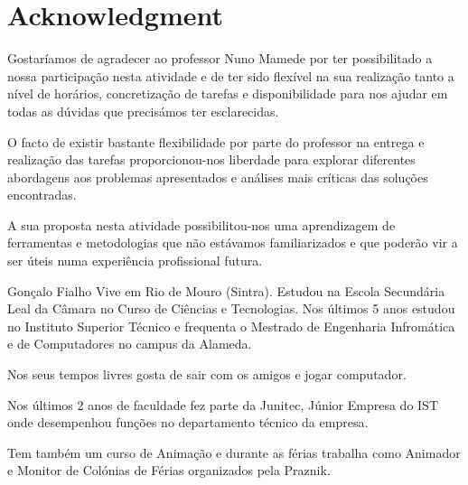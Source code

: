 \documentclass[a4paper,12pt,journal,twoside,compsoc]{PPIEEEtran}
\begin{document}


\ifCLASSOPTIONcompsoc
  \section*{} %
\else
  \section*{Acknowledgment}
\fi

Gostaríamos de agradecer ao professor Nuno Mamede por ter possibilitado a nossa participação nesta atividade e de ter sido flexível na sua realização tanto a nível de horários, concretização de tarefas e disponibilidade para nos ajudar em todas as dúvidas que precisámos ter esclarecidas. 


O facto de existir bastante flexibilidade por parte do professor na entrega e realização das tarefas proporcionou-nos liberdade para explorar diferentes abordagens aos problemas apresentados e análises mais críticas das soluções encontradas.


A sua proposta nesta atividade possibilitou-nos uma aprendizagem de ferramentas e metodologias que não estávamos familiarizados e que poderão vir a ser úteis numa experiência profissional futura.


% 

\begin{IEEEbiography}{Gonçalo Fialho}
Vive em Rio de Mouro (Sintra). Estudou na Escola Secundária Leal da Câmara no Curso de Ciências e Tecnologias. Nos últimos 5 anos estudou no Instituto Superior Técnico e frequenta o Mestrado de Engenharia Infromática e de Computadores no campus da Alameda. 

Nos seus tempos livres gosta de sair com os amigos e jogar computador. 

Nos últimos 2 anos de faculdade fez parte da Junitec, Júnior Empresa do IST onde desempenhou funções no departamento técnico da empresa. 

Tem também um curso de Animação e durante as férias trabalha como Animador e Monitor de Colónias de Férias organizados pela Praznik.
\end{IEEEbiography}
\end{document}
